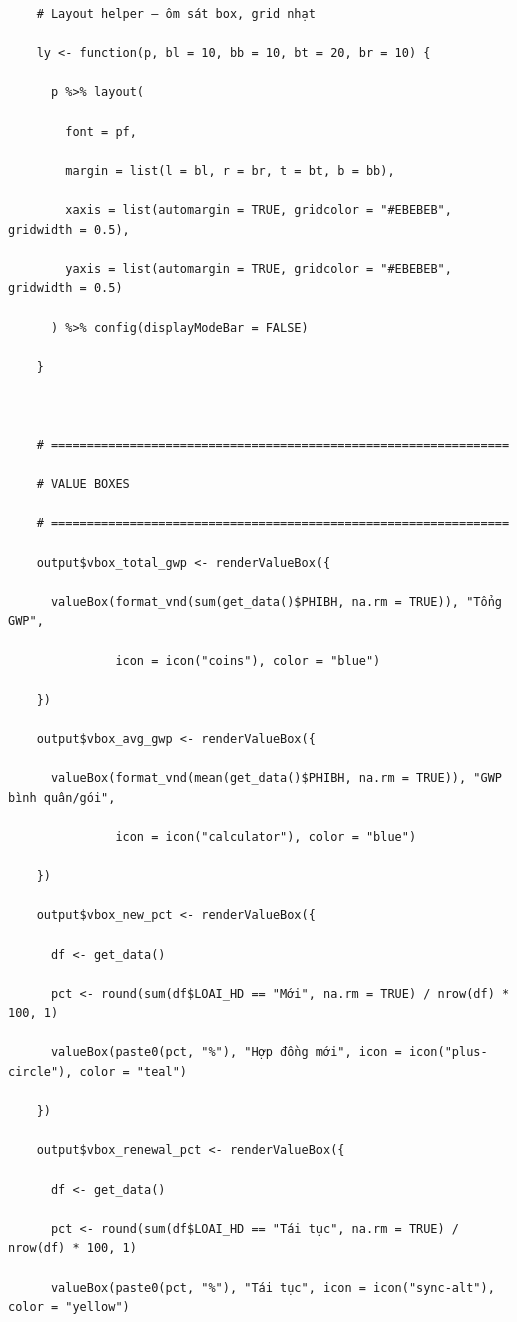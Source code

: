 \documentclass[12pt, a4paper]{article}
\begin{document}
\begin{lstlisting}
    # Layout helper — ôm sát box, grid nhạt

    ly <- function(p, bl = 10, bb = 10, bt = 20, br = 10) {

      p %>% layout(

        font = pf,

        margin = list(l = bl, r = br, t = bt, b = bb),

        xaxis = list(automargin = TRUE, gridcolor = "#EBEBEB", gridwidth = 0.5),

        yaxis = list(automargin = TRUE, gridcolor = "#EBEBEB", gridwidth = 0.5)

      ) %>% config(displayModeBar = FALSE)

    }



    # ================================================================

    # VALUE BOXES

    # ================================================================

    output$vbox_total_gwp <- renderValueBox({

      valueBox(format_vnd(sum(get_data()$PHIBH, na.rm = TRUE)), "Tổng GWP",

               icon = icon("coins"), color = "blue")

    })

    output$vbox_avg_gwp <- renderValueBox({

      valueBox(format_vnd(mean(get_data()$PHIBH, na.rm = TRUE)), "GWP bình quân/gói",

               icon = icon("calculator"), color = "blue")

    })

    output$vbox_new_pct <- renderValueBox({

      df <- get_data()

      pct <- round(sum(df$LOAI_HD == "Mới", na.rm = TRUE) / nrow(df) * 100, 1)

      valueBox(paste0(pct, "%"), "Hợp đồng mới", icon = icon("plus-circle"), color = "teal")

    })

    output$vbox_renewal_pct <- renderValueBox({

      df <- get_data()

      pct <- round(sum(df$LOAI_HD == "Tái tục", na.rm = TRUE) / nrow(df) * 100, 1)

      valueBox(paste0(pct, "%"), "Tái tục", icon = icon("sync-alt"), color = "yellow")


\end{lstlisting}
\end{document}
